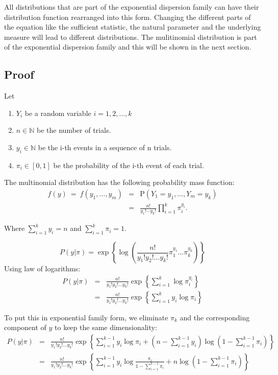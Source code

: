 \documentclass[12pt]{article}
\begin{document}
All distributions that are part of the exponential dispersion family can have their distribution function rearranged into this form. Changing the different parts of the equation like the sufficient statistic, the natural parameter and the underlying measure will lead to different distributions. The mulitinomial distribution is part of the exponential dispersion family and this will be shown in the next section.

\subsection{Proof}
Let
\begin{enumerate}
    \item $Y_i$ be a random variable $i=1,2,\dots,k$
    \item $n \in \mathbb{N}$ be the number of trials.
    \item $y_{i}\in \mathbb{N}$ be the i-th events in a sequence of n trials.
    \item $\pi_i \in [0,1]$ be the probability of the i-th event of each trial.
\end{enumerate}

The multinomial distribution has the following probability mass function:
\begin{eqnarray*}
  f(y) ~=~ f(y_1, \dots, y_m)
       & = & \text{P}(Y_1 = y_1, \dots, Y_m = y_k) \\
       & = & \frac{n!}{y_1! \cdots y_k!} \prod_{i = 1}^k \pi_i^{y_i}.
\end{eqnarray*}

Where \( \sum_{i=1}^k y_i = n\) and \( \sum_{i=1}^k \pi_i = 1\).

\[
    P(y|\pi) = \exp\left \{ \log \left( \frac{n!}{y_1! y_2! \ldots y_k!} \pi_1^{y_1} \dots \pi_k^{y_k} \right) \right \}
\]
Using law of logarithms:
\begin{eqnarray*}
P(y|\pi) &=& \frac{n!}{y_1! y_2! \ldots y_k!} \exp \left \{ \sum_{i=1}^k \log \pi_i^{y_i} \right \} \\
         &=& \frac{n!}{y_1! y_2! \ldots y_k!} \exp \left \{ \sum_{i=1}^k y_i \log \pi_i \right \}
\end{eqnarray*}

To put this in exponential family form, we eliminate \(\pi_k\) and the corresponding component of \(y\) to keep the same dimensionality:
\begin{eqnarray*}
    P(y|\pi) &=& \frac{n!}{y_1! y_2! \ldots y_{k}!} \exp \left \{ \sum_{i=1}^{k-1} y_i \log \pi_i + \left(n - \sum_{i=1}^{k-1} y_i\right) \log \left(1 - \sum_{i=1}^{k-1} \pi_i \right) \right \} \\
            &=& \frac{n!}{y_1! y_2! \ldots y_{k}!} \exp \left \{ \sum_{i=1}^{k-1} y_i \log  \frac{\pi_i}{1 - \sum_{i=1}^{k-1} \pi_i} + n\log \left(1 - \sum_{i=1}^{k-1} \pi_i \right) \right \}
\end{eqnarray*}
\end{document}
